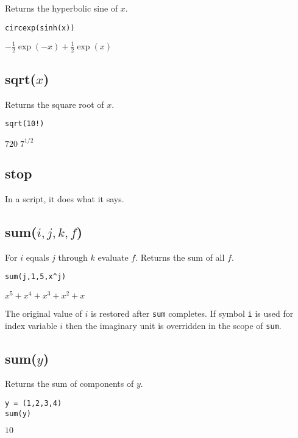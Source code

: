 \documentclass[12pt]{article}
\begin{document}
Returns the hyperbolic sine of $x$.

{\color{blue}
\begin{verbatim}
circexp(sinh(x))
\end{verbatim}
}

\noindent
$\displaystyle -\tfrac{1}{2}\exp(-x)+\tfrac{1}{2}\exp(x)$

\subsection*{sqrt($x$)}

Returns the square root of $x$.

{\color{blue}
\begin{verbatim}
sqrt(10!)
\end{verbatim}
}

\noindent
$\displaystyle 720\; 7^{1/2}$

\subsection*{stop}

In a script, it does what it says.

\subsection*{sum($i,j,k,f$)}

For $i$ equals $j$ through $k$ evaluate $f$.
Returns the sum of all $f$.

{\color{blue}
\begin{verbatim}
sum(j,1,5,x^j)
\end{verbatim}
}

\noindent
$\displaystyle x^5+x^4+x^3+x^2+x$

\bigskip
\noindent
The original value of $i$ is restored after {\tt sum} completes.
If symbol {\tt i} is used for index variable $i$
then the imaginary unit is overridden in the scope of {\tt sum}.

\subsection*{sum($y$)}

Returns the sum of components of $y$.

{\color{blue}
\begin{verbatim}
y = (1,2,3,4)
sum(y)
\end{verbatim}
}

\noindent
$10$
\end{document}
